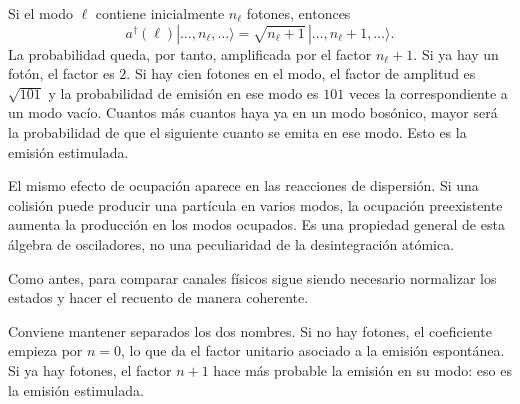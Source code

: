 Si el modo \(\ell\) contiene inicialmente \(n_\ell\) fotones, entonces
\begin{equation}
a^\dagger(\ell)
|\ldots,n_\ell,\ldots\rangle
=
\sqrt{n_\ell+1}
\,|\ldots,n_\ell+1,\ldots\rangle.
\end{equation}
La probabilidad queda, por tanto, amplificada por el factor \(n_\ell+1\). Si ya hay un fotón, el factor es \(2\). Si hay cien fotones en el modo, el factor de amplitud es \(\sqrt{101}\) y la probabilidad de emisión en ese modo es \(101\) veces la correspondiente a un modo vacío. Cuantos más cuantos haya ya en un modo bosónico, mayor será la probabilidad de que el siguiente cuanto se emita en ese modo. Esto es la emisión estimulada.

El mismo efecto de ocupación aparece en las reacciones de dispersión. Si una colisión puede producir una partícula en varios modos, la ocupación preexistente aumenta la producción en los modos ocupados. Es una propiedad general de esta álgebra de osciladores, no una peculiaridad de la desintegración atómica.

\begin{classroomqa}
\end{classroomqa}

Como antes, para comparar canales físicos sigue siendo necesario normalizar los estados y hacer el recuento de manera coherente.

\begin{classroomqa}
\end{classroomqa}

Conviene mantener separados los dos nombres. Si no hay fotones, el coeficiente empieza por \(n=0\), lo que da el factor unitario asociado a la emisión espontánea. Si ya hay fotones, el factor \(n+1\) hace más probable la emisión en su modo: eso es la emisión estimulada.

